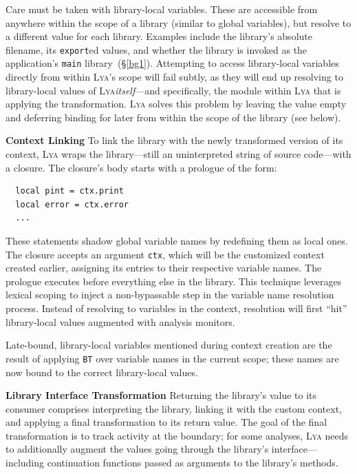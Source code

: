 \documentclass[letterpaper,twocolumn,10pt]{article}
\newcommand{\heading}[1]{\vspace{2pt}\noindent\textbf{#1}\enspace}
\newcommand{\ttt}[1]{\texttt{#1}}
\newcommand{\sx}[1]{(\S\ref{#1})}
\newcommand{\sys}{{\scshape Lya}\xspace}
\newcommand{\fixme}[1]{{\color{red}#1}}
\begin{document}
Care must be taken with library-local variables. %
These are accessible from anywhere within the scope of a library (similar to global variables), but resolve to a different value for each library.
Examples include the library's absolute filename, its \ttt{export}ed values, and whether the library is invoked as the application's \ttt{main} library~\sx{bg1}.
Attempting to access library-local variables directly from within \sys's scope will fail subtly, as they will end up resolving to library-local values of \sys \emph{itself}---and specifically, the module within \sys that is applying the transformation.
\sys solves this problem by leaving the value empty and deferring binding for later from within the scope of the library (see below).

\heading{Context Linking}
To link the library with the newly transformed version of its context, \sys wraps the library---still an uninterpreted string of source code---with a closure.
The closure's body starts with a prologue of the form:
\begin{verbatim}
  local pint = ctx.print
  local error = ctx.error
  ...
\end{verbatim}
These statements shadow global variable names by redefining them as local ones.
The closure accepts an argument \ttt{ctx}, which will be the customized context created earlier, assigning its entries to their respective variable names.
The prologue executes before everything else in the library.
This technique leverages lexical scoping to inject a non-bypassable step in the variable name resolution process.
Instead of resolving to variables in the context, resolution will first ``hit'' library-local values augmented with analysis monitors.

Late-bound, library-local variables mentioned during context creation are the result of applying \fixme{\ttt{BT}} over variable names in the current scope;
  these names are now bound to the correct library-local values.

\heading{Library Interface Transformation}
Returning the library's value to its consumer comprises interpreting the library, linking it with the custom context, and applying a final transformation to its return value.
The goal of the final transformation is to track activity at the boundary;
  for some analyses, \sys needs to additionally augment the values going through the library's interface---including continuation functions passed as arguments to the library's methods.
\end{document}
